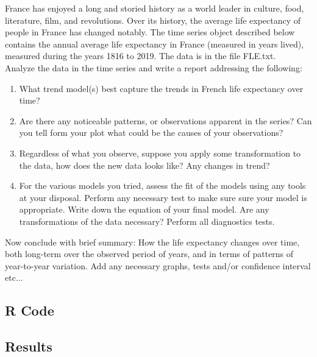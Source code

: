 France has enjoyed a long and storied history as a world leader in culture, food,
literature, film, and revolutions. Over its history, the average life expectancy of people in France
has changed notably. The time series object described below contains the annual average life
expectancy in France (measured in years lived), measured during the years 1816 to 2019. The
data is in the file FLE.txt. \\

\noindent Analyze the data in the time series and write a report addressing the following:

\begin{enumerate}[label=(\alph*)]
    \item What trend model(s) best capture the trends in French life expectancy over time?
    \item Are there any noticeable patterns, or observations apparent in the series? Can you tell form
your plot what could be the causes of your observations?
    \item Regardless of what you observe, suppose you apply some transformation to the data, how
does the new data looks like? Any changes in trend?
    \item For the various models you tried, assess the fit of the models using any tools at your disposal. Perform any necessary test to make sure sure your model is appropriate. Write down the equation of your final model. Are any transformations of the data necessary? Perform all diagnostics tests.
\end{enumerate}

\noindent Now conclude with brief summary: How the life expectancy changes over time, both long-term
over the observed period of years, and in terms of patterns of year-to-year variation. Add any
necessary graphs, tests and/or confidence interval etc...

\subsection{R Code}
\subsection{Results}
